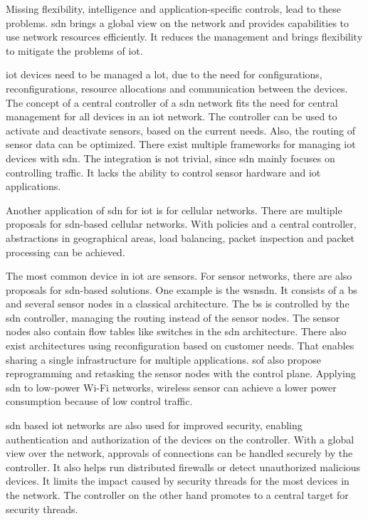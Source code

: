 \documentclass[conference]{IEEEtran}
\begin{document}
	Missing flexibility, intelligence and application-specific controls, lead to these problems. \ac{sdn} brings a global view on the network and provides capabilities to use network resources efficiently. It reduces the management and brings flexibility to mitigate the problems of \ac{iot}.

	\ac{iot} devices need to be managed a lot, due to the need for configurations, reconfigurations, resource allocations and communication between the devices. \cite{Sahrish2017} The concept of a central controller of a \ac{sdn} network fits the need for central management for all devices in an \ac{iot} network. The controller can be used to activate and deactivate sensors, based on the current needs. Also, the routing of sensor data can be optimized. \cite{Li2020-lx} There exist multiple frameworks for managing \ac{iot} devices with \ac{sdn}. \cite{Sahrish2017} The integration is not trivial, since \ac{sdn} mainly focuses on controlling traffic. It lacks the ability to control sensor hardware and \ac{iot} applications. \cite{Li2020-lx}

	Another application of \ac{sdn} for \ac{iot} is for cellular networks. There are multiple proposals for \ac{sdn}-based cellular networks. With policies and a central controller, abstractions in geographical areas, load balancing, packet inspection and packet processing can be achieved. \cite{Sahrish2017}

	The most common device in \ac{iot} are sensors. For sensor networks, there are also proposals for \ac{sdn}-based solutions. One example is the \ac{wsnsdn}. It consists of a \ac{bs} and several sensor nodes in a classical architecture. The \ac{bs} is controlled by the \ac{sdn} controller, managing the routing instead of the sensor nodes. The sensor nodes also contain flow tables like switches in the \ac{sdn} architecture. \cite{Sahrish2017} There also exist architectures using reconfiguration based on customer needs. That enables sharing a single infrastructure for multiple applications. \ac{sof} also propose reprogramming and retasking the sensor nodes with the control plane. \cite{Li2020-lx} Applying \ac{sdn} to low-power Wi-Fi networks, wireless sensor can achieve a lower power consumption because of low control traffic. \cite{Manguri2022-vp}

	\ac{sdn} based \ac{iot} networks are also used for improved security, enabling authentication and authorization of the devices on the controller. With a global view over the network, approvals of connections can be handled securely by the controller. It also helps run distributed firewalls or detect unauthorized malicious devices. \cite{Sahrish2017} It limits the impact caused by security threads for the most devices in the network. The controller on the other hand promotes to a central target for security threads. \cite{Li2020-lx}
\end{document}

